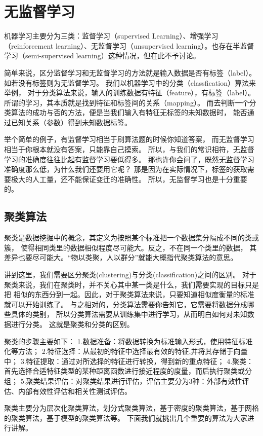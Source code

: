 \chapter{无监督学习}
\label{chap:unsupervised}
机器学习主要分为三类：监督学习（supervised Learning）、增强学习（reinforcement learning）、无监督学习（unsupervised
learning）。也存在半监督学习（semi-supervised learning）这种情况，但在此不予讨论。

简单来说，区分监督学习和无监督学习的方法就是输入数据是否有标签（label）。
如若没有标签则为无监督学习。
我们以机器学习中的分类（classfication）算法来举例，
对于分类算法来说，输入的训练数据有特征（feature），有标签（label）。
所谓的学习，其本质就是找到特征和标签间的关系（mapping）。
而去判断一个分类算法的成功与否的方法，便是当我们输入有特征无标签的未知数据时，
能否通过已知关系（参数）得到未知数据标签。

举个简单的例子，有监督学习相当于刷算法题的时候你知道答案，
而无监督学习相当于你根本就没有答案，只能靠自己摸索。
所以，与我们的常识相符，无监督学习的准确度往往比起有监督学习要低得多。
那也许你会问了，既然无监督学习准确度那么低，为什么我们还要用它呢？
那是因为在实际情况下，标签的获取需要极大的人工量，还不能保证变迁的准确性。
所以，无监督学习也是十分重要的。

\section{聚类算法}
聚类是数据挖掘中的概念，其定义为按照某个标准把一个数据集分隔成不同的类或簇，
使得相同类里的数据相似程度尽可能大。反之，不在同一个类里的数据，
其差异也要尽可能大。“物以类聚，人以群分”就能大概指代聚类算法的意思。

讲到这里，我们需要区分聚类(clustering)与分类(classification)之间的区别。
对于聚类来说，我们在聚类时，并不关心其中某一类是什么，我们需要实现的目标只是把
相似的东西分到一起。因此，对于聚类算法来说，只要知道相似度衡量的标准就可以开始训练了。
与之相对的，分类算法需要你告知它，它需要将数据分成哪些具体的类别，
所以分类算法需要从训练集中进行学习，从而明白如何对未知数据进行分类。
这就是聚类和分类的区别。

聚类的步骤主要如下：
1.数据准备：将数据转换为标准输入形式，使用特征标准化等方法；
2.特征选择：从最初的特征中选择最有效的特征,并将其存储于向量中；
3.特征提取：通过对所选择的特征进行转换，得到新的重点特征；
4.聚类：首先选择合适特征类型的某种距离函数进行接近程度的度量，而后执行聚类或分组；
5.聚类结果评估：对聚类结果进行评估，评估主要分为3种：外部有效性评估、内部有效性评估和相关性测试评估。

聚类主要分为层次化聚类算法，划分式聚类算法，基于密度的聚类算法，基于网格的聚类算法，基于模型的聚类算法等。
下面我们就挑出几个重要的算法为大家进行讲解。

